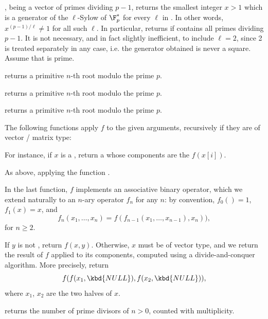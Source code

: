 ,  being a vector of
primes dividing $p - 1$, returns the smallest integer $x > 1$ which is a
generator of the $\ell$-Sylow of $\F_p^*$ for every $\ell$ in . In
other words, $x^{(p-1)/\ell} \neq 1$ for all such $\ell$. In particular,
returns  if  contains all primes dividing $p - 1$.
It is not necessary, and in fact slightly inefficient, to include $\ell=2$,
since 2 is treated separately in any case, i.e. the generator obtained is
never a square. Assume that  is prime.

 returns a primitive $n$-th root modulo
the prime $p$.

 returns a primitive $n$-th root modulo
the prime $p$.

 returns a primitive $n$-th root
modulo the prime $p$.


The following functions apply $f$ to the given arguments, recursively
if they are of vector / matrix type:

 For instance, if $x$ is a
, return a  whose components are the $f(x[i])$.

 As above, applying the
function .



In the last function, $f$ implements an associative binary operator, which we
extend naturally to an $n$-ary operator $f_n$ for any $n$: by convention,
$f_0() = 1$, $f_1(x) = x$, and
$$ f_n(x_1,\dots,x_n) = f( f_{n-1}(x_1,\dots,x_{n-1}), x_n)),$$
for $n \geq 2$.

 If $y$ is not
, return $f(x,y)$. Otherwise, $x$ must be of vector type, and we
return the result of $f$ applied to its components, computed using a
divide-and-conquer algorithm. More precisely, return
$$f( f(x_1,\kbd{NULL}), f(x_2,\kbd{NULL}) ),$$
where $x_1$, $x_2$ are the two halves of $x$.


 returns the number of prime divisors of $n >
0$, counted with multiplicity.


